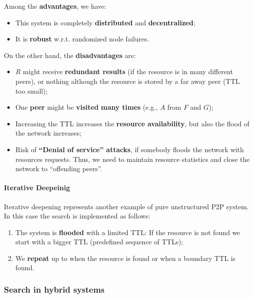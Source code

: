 
Among the \textbf{advantages}, we have:
\begin{itemize}
    \item This system is completely \textbf{distributed} and \textbf{decentralized};
    \item It is \textbf{robust} w.r.t. randomized node failures.
\end{itemize}

On the other hand, the \textbf{disadvantages} are:
\begin{itemize}
    \item $R$ might receive \textbf{redundant results} (if the resource is in many different peers), or nothing although the resource is stored by a far away peer (TTL too small);
    \item One \textbf{peer} might be \textbf{visited} \textbf{many times} (e.g., $A$ from $F$ and $G$);
    \item Increasing the TTL increases the \textbf{resource availability}, but also the flood of the network increases;
    \item Risk of \textbf{“Denial of service” attacks}, if somebody floods the network with resources requests. Thus, we need to maintain resource statistics and close the network to “offending peers”.
\end{itemize}

\paragraph{Iterative Deepeinig}
Iterative deepening represents another example of pure unstructured P2P system. In this case the search is implemented as follows:
\begin{enumerate}
    \item The system is \textbf{flooded} with a limited TTL: If the resource is not found we start with a bigger TTL (predefined sequence of TTLs);
    \item We \textbf{repeat} up to when the resource is found or when a boundary TTL is found.
\end{enumerate}

\subsubsection{Search in hybrid systems}
